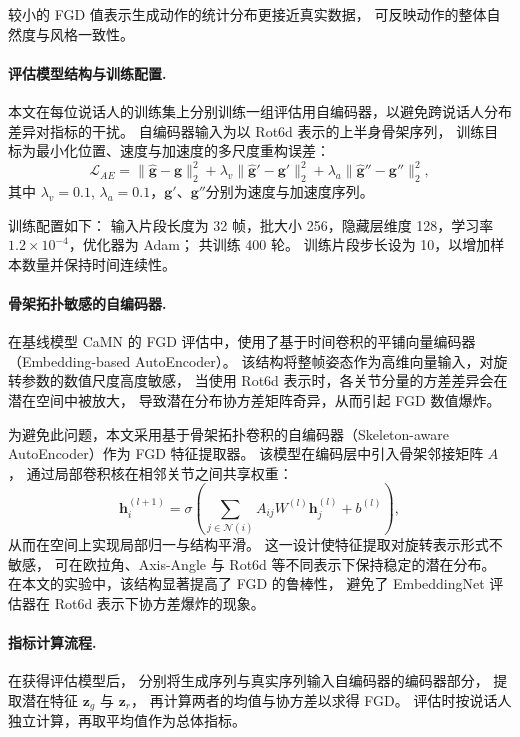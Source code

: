 较小的 FGD 值表示生成动作的统计分布更接近真实数据，
可反映动作的整体自然度与风格一致性。

\paragraph{评估模型结构与训练配置.}
本文在每位说话人的训练集上分别训练一组评估用自编码器，以避免跨说话人分布差异对指标的干扰。
自编码器输入为以 Rot6d 表示的上半身骨架序列，
训练目标为最小化位置、速度与加速度的多尺度重构误差：
\begin{equation}
\mathcal{L}_{AE} = 
\|\hat{\bm{g}} - \bm{g}\|_2^2 +
\lambda_v \|\hat{\bm{g}}' - \bm{g}'\|_2^2 +
\lambda_a \|\hat{\bm{g}}'' - \bm{g}''\|_2^2,
\end{equation}
其中 $\lambda_v = 0.1$, $\lambda_a = 0.1$，$\bm{g}'$、$\bm{g}''$分别为速度与加速度序列。

训练配置如下：
输入片段长度为 32 帧，批大小 256，隐藏层维度 128，学习率 $1.2\times10^{-4}$，优化器为 Adam；
共训练 400 轮。
训练片段步长设为 10，以增加样本数量并保持时间连续性。

\paragraph{骨架拓扑敏感的自编码器.}
在基线模型 CaMN 的 FGD 评估中，使用了基于时间卷积的平铺向量编码器（Embedding-based AutoEncoder）。
该结构将整帧姿态作为高维向量输入，对旋转参数的数值尺度高度敏感，
当使用 Rot6d 表示时，各关节分量的方差差异会在潜在空间中被放大，
导致潜在分布协方差矩阵奇异，从而引起 FGD 数值爆炸。

为避免此问题，本文采用基于骨架拓扑卷积的自编码器（Skeleton-aware AutoEncoder）作为 FGD 特征提取器。
该模型在编码层中引入骨架邻接矩阵 $A$，
通过局部卷积核在相邻关节之间共享权重：
\begin{equation}
\mathbf{h}_i^{(l+1)} = 
\sigma\left(
\sum_{j \in \mathcal{N}(i)} A_{ij} W^{(l)} \mathbf{h}_j^{(l)} + b^{(l)}
\right),
\end{equation}
从而在空间上实现局部归一与结构平滑。
这一设计使特征提取对旋转表示形式不敏感，
可在欧拉角、Axis-Angle 与 Rot6d 等不同表示下保持稳定的潜在分布。
在本文的实验中，该结构显著提高了 FGD 的鲁棒性，
避免了 EmbeddingNet 评估器在 Rot6d 表示下协方差爆炸的现象。

\paragraph{指标计算流程.}
在获得评估模型后，
分别将生成序列与真实序列输入自编码器的编码器部分，
提取潜在特征 $\bm{z}_g$ 与 $\bm{z}_r$，
再计算两者的均值与协方差以求得 FGD。
评估时按说话人独立计算，再取平均值作为总体指标。

